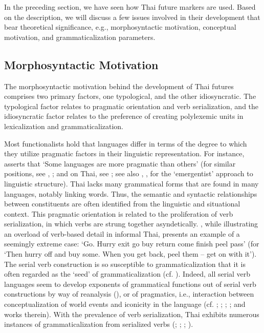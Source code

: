 \documentclass[output=paper,colorlinks,citecolor=brown]{langscibook}
\begin{document}
In the preceding section, we have seen how Thai future markers are used. Based on the description, we will discuss a few issues involved in their development that bear theoretical significance, e.g., morphosyntactic motivation, conceptual motivation, and grammaticalization parameters.


\subsection{Morphosyntactic Motivation}\label{sec:khammee:3.1}

The morphosyntactic motivation behind the development of Thai futures comprises two primary factors, one typological, and the other idiosyncratic. The typological factor relates to pragmatic orientation and verb serialization, and the idiosyncratic factor relates to the preference of creating polylexemic units in lexicalization and grammaticalization. 

Most functionalists hold that languages differ in terms of the degree to which they utilize pragmatic factors in their linguistic representation. For instance, \citet[276]{Huang2000} asserts that ‘Some languages are more pragmatic than others’ (for similar positions, see \cite{LiThompson1976}, \citeyear{LiThompson1979}; and on Thai, see \cite{bamgroongraks1987}; see also \cite{OGrady2005}, \citeyear{OGrady2008}, for the ‘emergentist’ approach to linguistic structure). Thai lacks many grammatical forms that are found in many languages, notably linking words. Thus, the semantic and syntactic relationships between constituents are often identified from the linguistic and situational context. This pragmatic orientation is related to the proliferation of verb serialization, in which verbs are strung together asyndetically. \citet[160]{Diller2006}, while illustrating an overload of verb-based detail in informal Thai, presents an example of a seemingly extreme case: ‘Go. Hurry exit go buy return come finish peel pass’ (for ‘Then hurry off and buy some. When you get back, peel them – get on with it’). The serial verb construction is so susceptible to grammaticalization that it is often regarded as the ‘seed’ of grammaticalization (cf. \cite[15--16]{DeLancey1991}). Indeed, all serial verb languages seem to develop exponents of grammatical functions out of serial verb constructions by way of reanalysis (\cite{Bynon1985}), or of pragmatics, i.e., interaction between conceptualization of world events and iconicity in the language (cf. \cite{Bruce1988}; \cite{DeLancey1991}; \cite{Lord1995}; \cite{Rhee1996}; \cite{aikhenwald_dixon2006} and works therein). With the prevalence of verb serialization, Thai exhibits numerous instances of grammaticalization from serialized verbs (\cite{Vis1978}; \cite{Thepkanjana1986}; \cite{Diller2006}; \cite{Park2011}). 
\end{document}
